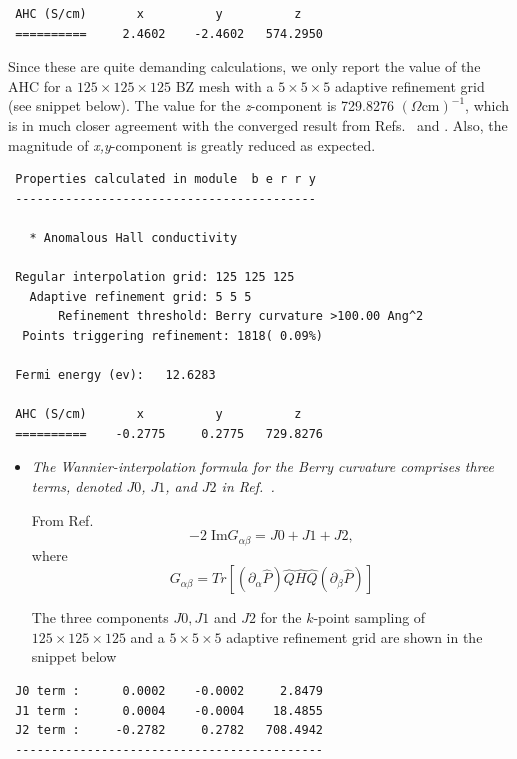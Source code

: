 \begin{itemize}
\begin{tcolorbox}[title=With adaptive refinement,sharp corners,boxrule=0.5pt]
{\begin{verbatim}
 AHC (S/cm)       x          y          z
 ==========     2.4602    -2.4602   574.2950
\end{verbatim}
}
\end{tcolorbox}

Since these are quite demanding calculations, we only report the value of the AHC for a $125\times125\times125$ BZ mesh with a $5\times5\times5$ adaptive refinement grid (see snippet below). The value for the \textit{z}-component is 729.8276 $(\Omega \mathrm{cm})^{-1}$, which is in much closer agreement with the converged result from Refs.~ and . Also, the magnitude of \textit{x,y}-component is greatly reduced as expected. 

\begin{tcolorbox}[title={$125\times125\times125$ BZ mesh with a $5\times5\times5$ adaptive refinement grid}]
{\small
\begin{verbatim}
 Properties calculated in module  b e r r y
 ------------------------------------------

   * Anomalous Hall conductivity
  
 Regular interpolation grid: 125 125 125
   Adaptive refinement grid: 5 5 5
       Refinement threshold: Berry curvature >100.00 Ang^2
  Points triggering refinement: 1818( 0.09%)

 Fermi energy (ev):   12.6283

 AHC (S/cm)       x          y          z
 ==========    -0.2775     0.2775   729.8276
\end{verbatim}
}
\end{tcolorbox} 
\end{itemize}

\begin{itemize}
	\item {\it The Wannier-interpolation formula for the Berry curvature comprises three terms, denoted $J0$, $J1$, and $J2$ in Ref.~.}

From Ref.~
\begin{equation}
-2\;\mathrm{Im} G_{\alpha\beta} = J0 + J1 + J2, 
\end{equation}
where 
\begin{equation}
G_{\alpha\beta} = Tr[(\partial_\alpha \hat{P})\hat{Q}\hat{H}\hat{Q}(\partial_\beta\hat{P})]
\end{equation}

The three components $J0, J1$ and $J2$ for the $k$-point sampling of $125\times125\times125$ and a $5\times5\times5$ adaptive refinement grid are shown in the snippet below 
\end{itemize}
\begin{tcolorbox}[sharp corners,boxrule=0.5pt]
{\small
\begin{verbatim}
 J0 term :      0.0002    -0.0002     2.8479
 J1 term :      0.0004    -0.0004    18.4855
 J2 term :     -0.2782     0.2782   708.4942
 -------------------------------------------
\end{verbatim}
}
\end{tcolorbox}

